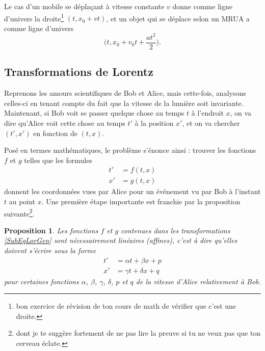 \documentclass[a4paper,12pt]{book}
\newcounter{numtho}
\theoremstyle{mes_exemples}	\newtheorem{exemple}[numtho]{Exemple}
\theoremstyle{mes_tho}
\newtheorem{proposition}[numtho]{Proposition}
\begin{document}
Le cas d'un mobile se déplaçant à vitesse constante $v$ donne comme ligne d'univers la droite\footnote{bon exercice de révision de ton cours de math de vérifier que c'est une droite.} $(t,x_0+vt)$, et un objet qui se déplace selon un MRUA a comme ligne d'univers
\[ 
  \big( t, x_0+v_0t+\frac{ at^2 }{ 2 } \big).
\]

\subsection{Transformations de Lorentz}

Reprenons les amours scientifiques de Bob et Alice, mais cette-fois, analysons celles-ci en tenant compte du fait que la vitesse de la lumière soit invariante. Maintenant, si Bob voit se passer quelque chose au temps $t$ à l'endroit $x$, on va dire qu'Alice voit cette chose au temps $t'$ à la position $x'$, et on va chercher $(t',x')$ en fonction de $(t,x)$. 

Posé en termes mathématiques, le problème s'énonce ainsi : trouver les fonctions $f$ et $g$ telles que les formules
\begin{subequations}	\label{SubEqLorGen}
\begin{align}
	t'&=f(t,x)\\
	x'&=g(t,x)
\end{align}
\end{subequations}
donnent les coordonnées vues par Alice pour un événement vu par Bob à l'instant $t$ au point $x$. Une première étape importante est franchie par la proposition suivante\footnote{dont je te suggère fortement de ne pas lire la preuve si tu ne veux pas que ton cerveau éclate.}.

\begin{proposition}
Les fonctions $f$ et $g$ contenues dans les transformations \eqref{SubEqLorGen} sont nécessairement linéaires (affines), c'est à dire qu'elles doivent s'écrire sous la forme
\[ 
\begin{split}
t'&=\alpha t+\beta x+p	\\
x'&=\gamma t+\delta x+q
\end{split}  
\]
pour certaines fonctions $\alpha$, $\beta$, $\gamma$, $\delta$, $p$ et $q$ de la vitesse d'Alice relativement à Bob.
\end{proposition}
\end{document}
